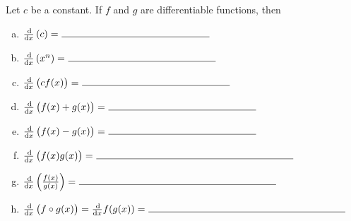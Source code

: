 \documentclass[12pt]{amsart}
\begin{document}
\begin{thm}
  Let \(c\) be a constant.
  If \(f\) and \(g\) are differentiable functions, then
  \begin{enumerate}[(a)]
  \item
    \(\frac{\dif}{\dif x}\left(c\right) =\ \line(1,0){150}\)
    \vspace{.25in}
  \item
    \(\frac{\dif}{\dif x}\left(x^n\right) =\ \line(1,0){150}\)
    \vspace{.25in}
  \item
    \(\frac{\dif}{\dif x}\left(cf(x)\right) =\ \line(1,0){150}\)
    \vspace{.25in}
  \item
    \(\frac{\dif}{\dif x}\left(f(x) + g(x)\right) =\ \line(1,0){150}\)
    \vspace{.25in}
  \item
    \(\frac{\dif}{\dif x}\left(f(x) - g(x)\right) =\ \line(1,0){150}\)
    \vspace{.25in}
  \item
    \(\frac{\dif}{\dif x}\left(f(x)g(x)\right) =\ \line(1,0){200}\)
    \vspace{.25in}
  \item
    \(\frac{\dif}{\dif x}\left(\frac{f(x)}{g(x)}\right) =\ \line(1,0){200}\)
    \vspace{.25in}
  \item
    \(\frac{\dif}{\dif x}\left(f \circ g (x)\right) = \frac{\dif}{\dif x} f(g(x)) =\ \line(1,0){200}\)
  \end{enumerate}
\end{thm}
\end{document}
